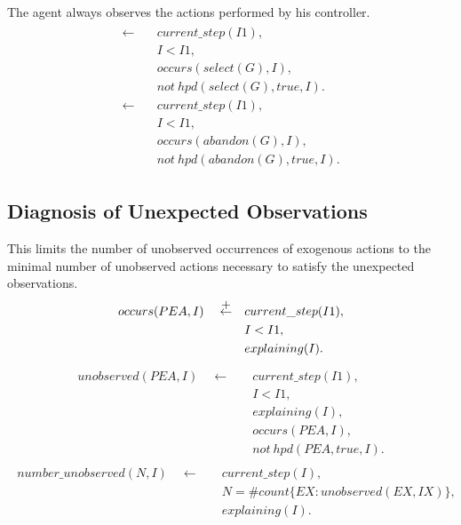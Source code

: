 \documentclass[11pt, oneside]{article}
\begin{document}
The agent always observes the actions performed by his controller. 
\begin{align}\begin{split}
\leftarrow \quad &current\_step(I1),\\
&I<I1,\\
&occurs(select(G),I),\\
&not\ hpd(select(G), true, I).\\
\leftarrow \quad &current\_step(I1),\\
&I<I1,\\
&occurs(abandon(G),I),\\
&not\ hpd(abandon(G), true, I).
\end{split}\end{align}

\subsection{Diagnosis of Unexpected Observations}
This limits the number of unobserved occurrences of exogenous actions to the minimal number of unobserved actions necessary to satisfy the unexpected observations.
\begin{align}\begin{split}
occurs(PEA,I)  \quad \stackrel{\mathclap{\normalfont\mbox{+}}}{\leftarrow}  \quad &current\_step(I1),\\
&I<I1,\\
&explaining(I).
\end{split}\end{align}
\begin{align}\begin{split}
unobserved(PEA,I) \quad \leftarrow \quad &current\_step(I1), \\
&I < I1,\\
&explaining(I),\\
&occurs(PEA,I),\\
&not\ hpd(PEA,true,I).
\end{split}\end{align}
\begin{align}\begin{split}
number\_unobserved(N, I) \quad \leftarrow \quad &current\_step(I),\\
&N = \#count\{EX: unobserved(EX, IX)\},\\
&explaining(I).
\end{split}\end{align}
\end{document}
